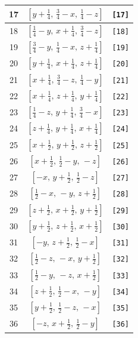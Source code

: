 \documentclass[fleqn,8pt]{jsarticle}
\begin{document}
\begin{longtable}{ccc}
17 & $\left[ y + \frac{1}{4},\, \frac{3}{4} - x,\, \frac{1}{4} - z \right]$ & {\tt [17]} \\ \hline
18 & $\left[ \frac{1}{4} - y,\, x + \frac{1}{4},\, \frac{3}{4} - z \right]$ & {\tt [18]} \\ \hline
19 & $\left[ \frac{3}{4} - y,\, \frac{1}{4} - x,\, z + \frac{1}{4} \right]$ & {\tt [19]} \\ \hline
20 & $\left[ y + \frac{1}{4},\, x + \frac{1}{4},\, z + \frac{1}{4} \right]$ & {\tt [20]} \\ \hline
21 & $\left[ x + \frac{1}{4},\, \frac{3}{4} - z,\, \frac{1}{4} - y \right]$ & {\tt [21]} \\ \hline
22 & $\left[ x + \frac{1}{4},\, z + \frac{1}{4},\, y + \frac{1}{4} \right]$ & {\tt [22]} \\ \hline
23 & $\left[ \frac{1}{4} - z,\, y + \frac{1}{4},\, \frac{3}{4} - x \right]$ & {\tt [23]} \\ \hline
24 & $\left[ z + \frac{1}{4},\, y + \frac{1}{4},\, x + \frac{1}{4} \right]$ & {\tt [24]} \\ \hline
25 & $\left[ x + \frac{1}{2},\, y + \frac{1}{2},\, z + \frac{1}{2} \right]$ & {\tt [25]} \\ \hline
26 & $\left[ x + \frac{1}{2},\, \frac{1}{2} - y,\, - z \right]$ & {\tt [26]} \\ \hline
27 & $\left[ - x,\, y + \frac{1}{2},\, \frac{1}{2} - z \right]$ & {\tt [27]} \\ \hline
28 & $\left[ \frac{1}{2} - x,\, - y,\, z + \frac{1}{2} \right]$ & {\tt [28]} \\ \hline
29 & $\left[ z + \frac{1}{2},\, x + \frac{1}{2},\, y + \frac{1}{2} \right]$ & {\tt [29]} \\ \hline
30 & $\left[ y + \frac{1}{2},\, z + \frac{1}{2},\, x + \frac{1}{2} \right]$ & {\tt [30]} \\ \hline
31 & $\left[ - y,\, z + \frac{1}{2},\, \frac{1}{2} - x \right]$ & {\tt [31]} \\ \hline
32 & $\left[ \frac{1}{2} - z,\, - x,\, y + \frac{1}{2} \right]$ & {\tt [32]} \\ \hline
33 & $\left[ \frac{1}{2} - y,\, - z,\, x + \frac{1}{2} \right]$ & {\tt [33]} \\ \hline
34 & $\left[ z + \frac{1}{2},\, \frac{1}{2} - x,\, - y \right]$ & {\tt [34]} \\ \hline
35 & $\left[ y + \frac{1}{2},\, \frac{1}{2} - z,\, - x \right]$ & {\tt [35]} \\ \hline
36 & $\left[ - z,\, x + \frac{1}{2},\, \frac{1}{2} - y \right]$ & {\tt [36]} \\ \hline

\end{longtable}
\end{document}
